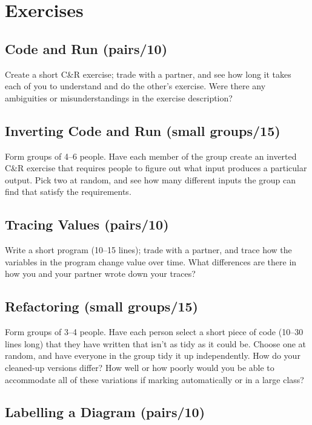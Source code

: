 \section{Exercises}\label{s:exercises-exercises}

\subsection*{Code and Run (pairs/10)}

Create a short C\&R exercise; trade with a partner, and see how long it
takes each of you to understand and do the other's exercise. Were there
any ambiguities or misunderstandings in the exercise description?

\subsection*{Inverting Code and Run (small groups/15)}

Form groups of 4--6 people. Have each member of the group create an
inverted C\&R exercise that requires people to figure out what input
produces a particular output. Pick two at random, and see how many
different inputs the group can find that satisfy the requirements.

\subsection*{Tracing Values (pairs/10)}

Write a short program (10--15 lines); trade with a partner, and trace how
the variables in the program change value over time. What differences
are there in how you and your partner wrote down your traces?

\subsection*{Refactoring (small groups/15)}

Form groups of 3--4 people. Have each person select a short piece of code
(10--30 lines long) that they have written that isn't as tidy as it could
be. Choose one at random, and have everyone in the group tidy it up
independently. How do your cleaned-up versions differ? How well or how
poorly would you be able to accommodate all of these variations if
marking automatically or in a large class?

\subsection*{Labelling a Diagram (pairs/10)}

